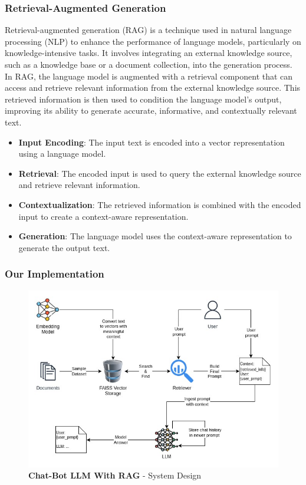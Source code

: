 \documentclass{article}
\begin{document}
	\subsubsection{Retrieval-Augmented Generation}
	Retrieval-augmented generation \cite{lewis2021retrievalaugmentedgenerationknowledgeintensivenlp} (RAG) is a technique used in natural language processing (NLP) to enhance the performance of language models, particularly on knowledge-intensive tasks. It involves integrating an external knowledge source, such as a knowledge base or a document collection, into the generation process. 
	In RAG, the language model is augmented with a retrieval component that can access and retrieve relevant information from the external knowledge source. This retrieved information is then used to condition the language model's output, improving its ability to generate accurate, informative, and contextually relevant text. 
	
	\begin{itemize}
		\item \textbf{Input Encoding}: The input text is encoded into a vector representation using a language model.
		\item \textbf{Retrieval}: The encoded input is used to query the external knowledge source and retrieve relevant information.
		\item \textbf{Contextualization}: The retrieved information is combined with the encoded input to create a context-aware representation.
		\item \textbf{Generation}: The language model uses the context-aware representation to generate the output text.
	\end{itemize}
	
	\subsubsection{Our Implementation}
	
	\begin{figure}[h]
		\centering
		\includegraphics[width=13cm]{Chat_RAG}
		\caption{\textbf{Chat-Bot LLM With RAG} - System Design}
	\end{figure}
	
\end{document}
